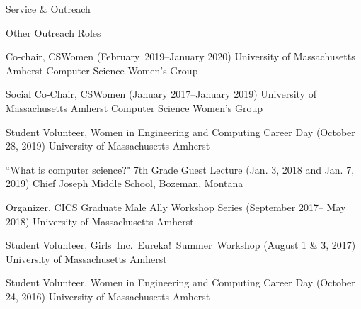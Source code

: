 \documentclass{resume} %
\begin{document}
\begin{rSection}{Service \& Outreach}
\begin{rSubsection}{Other Outreach Roles}{}{}{}
\item 
{Co-chair, CSWomen} ({February~2019--January 2020}) {University of Massachusetts Amherst Computer Science Women's Group}

\item 
{Social Co-Chair,  CSWomen} ({January 2017--January 2019}) 
{University of Massachusetts Amherst Computer Science Women's Group}

\item {Student Volunteer, Women in Engineering and Computing Career Day} ({October 28, 2019})
{University of Massachusetts Amherst}{}


\item {``What is computer science?" 7th Grade Guest Lecture} ({Jan. 3, 2018 and Jan. 7, 2019}) 
{Chief Joseph Middle School, Bozeman, Montana}

\item {Organizer, CICS Graduate Male Ally Workshop Series} ({September 2017-- May 2018}) {University of Massachusetts Amherst}

\item {Student Volunteer, Girls~Inc.~Eureka!~Summer~Workshop} ({August 1 \& 3, 2017}) {University of Massachusetts Amherst}

\item {Student Volunteer, Women in Engineering and Computing Career Day} ({October 24, 2016})
{University of Massachusetts Amherst}{}
\end{rSubsection}

\end{rSection}





\end{document}
